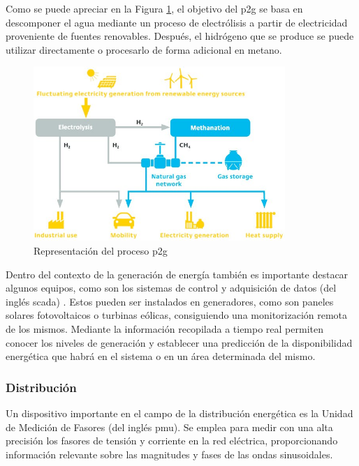\vspace{3mm}

Como se puede apreciar en la Figura \ref{fig:p2g}, el objetivo del \gls{p2g} se basa en descomponer el agua mediante un proceso de electrólisis a partir de electricidad proveniente de fuentes renovables. Después, el hidrógeno que se produce se puede utilizar directamente o procesarlo de forma adicional en metano. 

\begin{figure}[h!]
  \centering
  \includegraphics[width=0.85\textwidth]{img/teoria/p2g.jpg}
  \caption{Representación del proceso \acrshort{p2g} \cite{p2g}}
  \label{fig:p2g}
\end{figure}

Dentro del contexto de la generación de energía también es importante destacar algunos equipos, como son los sistemas de control y adquisición de datos (del inglés \gls{scada}) \cite{scada}. Estos pueden ser instalados en generadores, como son paneles solares fotovoltaicos o turbinas eólicas, consiguiendo una monitorización remota de los mismos. Mediante la información recopilada a tiempo real permiten conocer los niveles de generación y establecer una predicción de la disponibilidad energética que habrá en el sistema o en un área determinada del mismo.

\vspace{3mm}

\subsubsection{Distribución}

Un dispositivo importante en el campo de la distribución energética es la Unidad de Medición de Fasores (del inglés \gls{pmu}). Se emplea para medir con una alta precisión los fasores de tensión y corriente en la red eléctrica, proporcionando información relevante sobre las magnitudes y fases de las ondas sinusoidales. 

